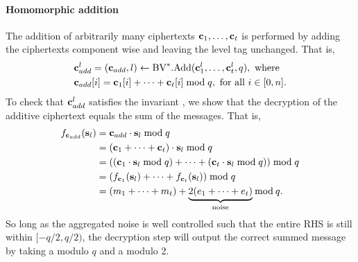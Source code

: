 \documentclass[../main.tex]{subfiles}
\begin{document}
\paragraph{Homomorphic addition} The addition of arbitrarily many ciphertexts $\mathbf{c}_1, \dots, \mathbf{c}_t$ is performed by adding the ciphertexts component wise and leaving the level tag unchanged. That is, %
\begin{align}%
\label{eq:bvv.add}
    &\vc{c}_{add}^l = (\vc{c}_{add},l) \leftarrow \bvv.\add(\vc{c}_1^l, \dots, \vc{c}_t^l,q), \text{ where } \nonumber \\
    &\vc{c}_{add}[i]=\vc{c}_1[i]+\cdots+\vc{c}_t[i] \bmod q, \text{ for all } i \in [0,n].
\end{align}%
To check that $\mathbf{c}_{add}^l$ satisfies the invariant , we show that the decryption of the additive ciphertext equals the sum of the messages. That is,
\begin{align*}
    f_{\mathbf{c}_{add}}(\mathbf{s}_l) &= \mathbf{c}_{add} \cdot \mathbf{s}_l \bmod q \\
    &=(\mathbf{c}_1 +\cdots+ \mathbf{c}_t) \cdot \mathbf{s}_l \bmod q\\
    &=((\mathbf{c}_1 \cdot \mathbf{s}_l \bmod q) + \cdots + (\mathbf{c}_t \cdot \mathbf{s}_l \bmod q)) \bmod q\\
    &=(f_{\mathbf{c}_1}(\mathbf{s}_l) +\cdots+ f_{\mathbf{c}_t}(\mathbf{s}_l)) \bmod q\\
    &=(m_1 + \cdots + m_t) + \underbrace{2(e_1 + \cdots + e_t)}_{\text{noise}} \bmod \,q.
\end{align*}
So long as the aggregated noise is well controlled such that the entire RHS is still within $[-q/2,q/2)$, the decryption step will output the correct summed message by taking a modulo $q$ and a modulo 2. 
\end{document}
